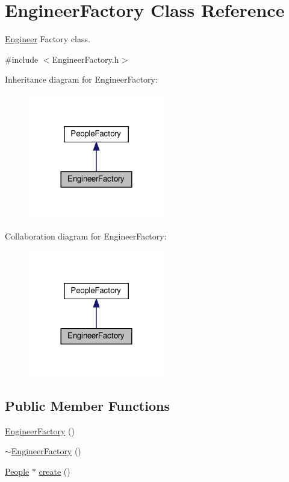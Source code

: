 \hypertarget{classEngineerFactory}{}\section{Engineer\+Factory Class Reference}
\label{classEngineerFactory}


\hyperlink{classEngineer}{Engineer} Factory class.  




{\ttfamily \#include $<$Engineer\+Factory.\+h$>$}



Inheritance diagram for Engineer\+Factory\+:\nopagebreak
\begin{figure}[H]
\begin{center}
\leavevmode
\includegraphics[width=168pt]{classEngineerFactory__inherit__graph}
\end{center}
\end{figure}


Collaboration diagram for Engineer\+Factory\+:\nopagebreak
\begin{figure}[H]
\begin{center}
\leavevmode
\includegraphics[width=168pt]{classEngineerFactory__coll__graph}
\end{center}
\end{figure}
\subsection*{Public Member Functions}
\begin{DoxyCompactItemize}
\item 
\hyperlink{classEngineerFactory_a71b5abb3e85ebe5f78eaafc388d0ed2d}{Engineer\+Factory} ()
\item 
\hyperlink{classEngineerFactory_af892e0d4b047414dbcefee0bbe943208}{$\sim$\+Engineer\+Factory} ()
\item 
\hyperlink{classPeople}{People} $\ast$ \hyperlink{classEngineerFactory_a7a66d4957f1f9b821771c43e5af289f2}{create} ()
\end{DoxyCompactItemize}



